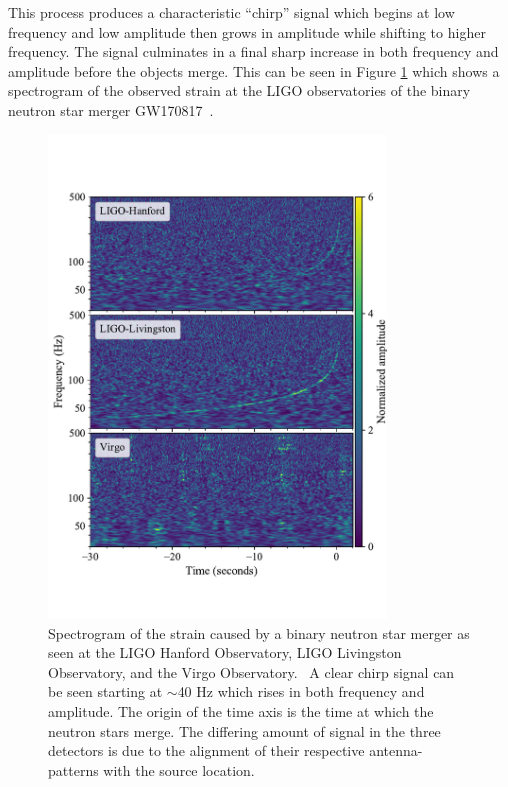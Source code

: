 \documentclass [12pt, proquest]{uwthesis}[2019]
\begin{document}
This process produces a characteristic ``chirp'' signal which begins at low frequency and low amplitude then grows in amplitude while shifting to higher frequency. The signal culminates in a final sharp increase in both frequency and amplitude before the objects merge. This can be seen in Figure \ref{GW170817} which shows a spectrogram of the observed strain at the LIGO observatories of the binary neutron star merger GW170817~\cite{GW170817}.
 
\begin{figure}
\begin{center}
\includegraphics[width=0.8\textwidth]{GW170817.pdf}
\caption[Spectrogram of the strain caused by a binary neutron star merger]{Spectrogram of the strain caused by a binary neutron star merger as seen at the LIGO Hanford Observatory, LIGO Livingston Observatory, and the Virgo Observatory.~\cite{GW170817} A clear chirp signal can be seen starting at $\sim$40 Hz which rises in both frequency and amplitude. The origin of the time axis is the time at which the neutron stars merge. The differing amount of signal in the three detectors is due to the alignment of their respective antenna-patterns with the source location.}
\label{GW170817}
\end{center}
\end{figure}
 
\end{document}
